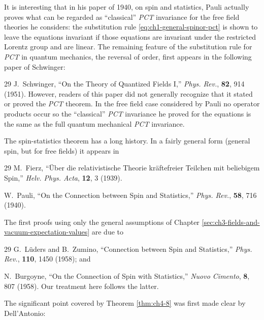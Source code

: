 It is interesting that in his paper of 1940, on spin and statistics, Pauli
actually proves what can be regarded as ``classical'' \emph{PCT} invariance
for the free field theories he considers: the substitution rule \eqref{eq:ch1-general-spinor-pct} is
shown to leave the equations invariant if those equations are invariant under
the restricted Lorentz group and are linear. The remaining feature of the
substitution rule for \emph{PCT} in quantum mechanics, the reversal of order,
first appears in the following paper of Schwinger:

\begin{thebibliography}{29}
\setcounter{NAT@ctr}{11}
 J.~Schwinger, ``On the Theory of Quantized Fields I,''
\emph{Phys. Rev.}, \textbf{82}, 914 (1951). However, readers of this paper
did not generally recognize that it stated or proved the \emph{PCT} theorem.
In the free field case considered by Pauli no operator products occur so the
``classical'' \emph{PCT} invariance he proved for the equations is the same as
the full quantum mechanical \emph{PCT} invariance.
\end{thebibliography}

The spin-statistics theorem has a long history. In a fairly general form
(general spin, but for free fields) it appears in

\begin{thebibliography}{29}
\setcounter{NAT@ctr}{12}
 M.~Fierz, ``\"Uber die relativistische Theorie kr\"aftefreier
Teilchen mit beliebigem Spin,'' \emph{Helv. Phys. Acta}, \textbf{12}, 3
(1939).

 W.~Pauli, ``On the Connection between Spin and Statistics,''
\emph{Phys. Rev.}, \textbf{58}, 716 (1940).
\end{thebibliography}

The first proofs using only the general assumptions of Chapter \ref{sec:ch3-fields-and-vacuum-expectation-values} are due to

\begin{thebibliography}{29}
\setcounter{NAT@ctr}{14}
 G.~L\"uders and B.~Zumino, ``Connection between Spin and
Statistics,'' \emph{Phys. Rev.}, \textbf{110}, 1450 (1958); and

 N.~Burgoyne, ``On the Connection of Spin with Statistics,''
\emph{Nuovo Cimento}, \textbf{8}, 807 (1958). Our treatment here follows the
latter.
\end{thebibliography}

The significant point covered by Theorem \ref{thm:ch4-8} was first made clear by
Dell'Antonio:

